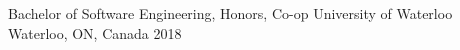 \vspace{-5.8mm}
\begin{cventries}
  \cventry
    {Bachelor of Software Engineering, Honors, Co-op}
    {University of Waterloo}
    {Waterloo, ON, Canada}
    {2018}
    {}
\end{cventries}
